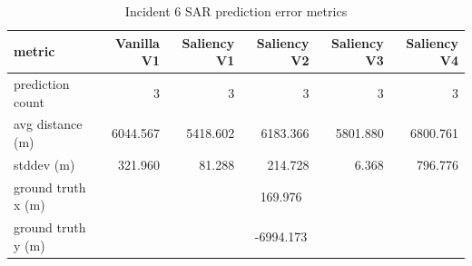 \begin{table}[ht]
\centering
\caption{Incident 6 SAR prediction error metrics}
\label{tab:sar-incident-6}
\begin{tabular}{lrrrrr}
\hline
metric & Vanilla V1 & Saliency V1 & Saliency V2 & Saliency V3 & Saliency V4 \\
\hline
prediction count & 3 & 3 & 3 & 3 & 3 \\
avg distance (m) & 6044.567 & 5418.602 & 6183.366 & 5801.880 & 6800.761 \\
stddev (m) & 321.960 & 81.288 & 214.728 & 6.368 & 796.776 \\
ground truth x (m) & \multicolumn{5}{c}{169.976} \\
ground truth y (m) & \multicolumn{5}{c}{-6994.173} \\
\hline
\end{tabular}
\end{table}
